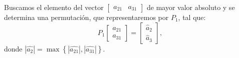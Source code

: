\begin{frame}
\begin{solution}
\begin{enumerate}[b)]
\begin{description}
					      Buscamos el elemento del vector
					      \begin{math}
						      \begin{bmatrix}
							      a_{21} & a_{31}
						      \end{bmatrix}
					      \end{math}
					      de mayor valor absoluto y se determina una permutación, que
					      representaremos por
					      \begin{math}
						      P_{1}
					      \end{math}, tal que:
					      \begin{equation*}
						      {P}_{1}
						      \begin{bmatrix}
							      a_{21} \\
							      a_{31}
						      \end{bmatrix}=
						      \begin{bmatrix}
							      \widehat{a}_{2} \\
							      \widehat{a}_{3}
						      \end{bmatrix},
					      \end{equation*}
					      donde
					      \begin{math}
						      \left|\widehat{a_{2}}\right|=
						      \max\left\{
						      \left|\widehat{a_{21}}\right|,
						      \left|\widehat{a_{31}}\right|
						      \right\}
					      \end{math}.
			      \end{description}
		\end{enumerate}
	\end{solution}
\end{frame}

